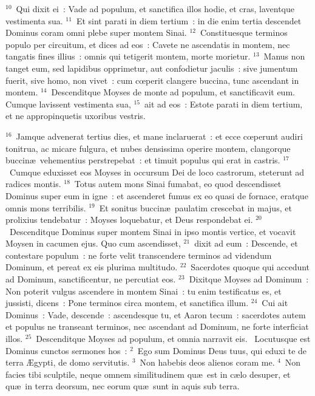 ${}^{10}$~Qui dixit ei~: Vade ad populum, et sanctifica illos hodie, et cras, laventque vestimenta sua.
${}^{11}$~Et sint parati in diem tertium~: in die enim tertia descendet Dominus coram omni plebe super montem Sinai.
${}^{12}$~Constituesque terminos populo per circuitum, et dices ad eos~: Cavete ne ascendatis in montem, nec tangatis fines illius~: omnis qui tetigerit montem, morte morietur.
${}^{13}$~Manus non tanget eum, sed lapidibus opprimetur, aut confodietur jaculis~: sive jumentum fuerit, sive homo, non vivet~: cum cœperit clangere buccina, tunc ascendant in montem.
${}^{14}$~Descenditque Moyses de monte ad populum, et sanctificavit eum. Cumque lavissent vestimenta sua,
${}^{15}$~ait ad eos~: Estote parati in diem tertium, et ne appropinquetis uxoribus vestris.


${}^{16}$~Jamque advenerat tertius dies, et mane inclaruerat~: et ecce cœperunt audiri tonitrua, ac micare fulgura, et nubes densissima operire montem, clangorque buccin\ae\ vehementius perstrepebat~: et timuit populus qui erat in castris.
${}^{17}$~Cumque eduxisset eos Moyses in occursum Dei de loco castrorum, steterunt ad radices montis.
${}^{18}$~Totus autem mons Sinai fumabat, eo quod descendisset Dominus super eum in igne~: et ascenderet fumus ex eo quasi de fornace, eratque omnis mons terribilis.
${}^{19}$~Et sonitus buccin\ae\ paulatim crescebat in majus, et prolixius tendebatur~: Moyses loquebatur, et Deus respondebat ei.
${}^{20}$~Descenditque Dominus super montem Sinai in ipso montis vertice, et vocavit Moysen in cacumen ejus. Quo cum ascendisset,
${}^{21}$~dixit ad eum~: Descende, et contestare populum~: ne forte velit transcendere terminos ad videndum Dominum, et pereat ex eis plurima multitudo.
${}^{22}$~Sacerdotes quoque qui accedunt ad Dominum, sanctificentur, ne percutiat eos.
${}^{23}$~Dixitque Moyses ad Dominum~: Non poterit vulgus ascendere in montem Sinai~: tu enim testificatus es, et jussisti, dicens~: Pone terminos circa montem, et sanctifica illum.
${}^{24}$~Cui ait Dominus~: Vade, descende~: ascendesque tu, et Aaron tecum~: sacerdotes autem et populus ne transeant terminos, nec ascendant ad Dominum, ne forte interficiat illos.
${}^{25}$~Descenditque Moyses ad populum, et omnia narravit eis.
~Locutusque est Dominus cunctos sermones hos~:
${}^{2}$~Ego sum Dominus Deus tuus, qui eduxi te de terra \AE gypti, de domo servitutis.
${}^{3}$~Non habebis deos alienos coram me.
${}^{4}$~Non facies tibi sculptile, neque omnem similitudinem qu\ae\ est in c\ae lo desuper, et qu\ae\ in terra deorsum, nec eorum qu\ae\ sunt in aquis sub terra.
